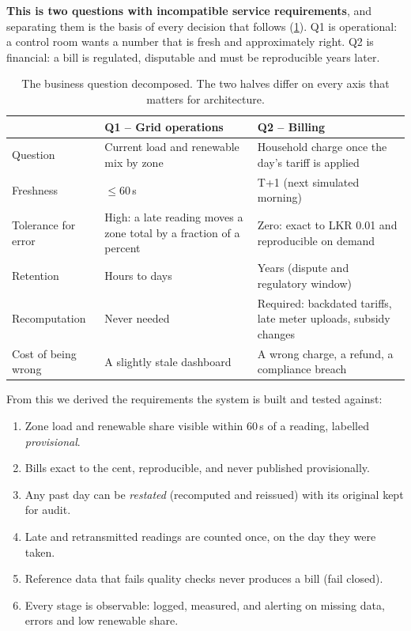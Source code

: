 \documentclass[11pt,a4paper]{article}
\newcommand{\sq}{Q}
\begin{document}
\textbf{This is two questions with incompatible service requirements}, and
separating them is the basis of every decision that follows (\cref{tab:q1q2}).
\sq1 is operational: a control room wants a number that is fresh and
approximately right. \sq2 is financial: a bill is regulated, disputable and
must be reproducible years later.

\begin{table}[!htbp]
\centering\small
\caption{The business question decomposed. The two halves differ on every axis that matters for architecture.}
\label{tab:q1q2}
\begin{tabularx}{\linewidth}{@{}l>{\raggedright\arraybackslash}X>{\raggedright\arraybackslash}X@{}}
\toprule
 & \textbf{\sq1 -- Grid operations} & \textbf{\sq2 -- Billing} \\
\midrule
Question & Current load and renewable mix by zone & Household charge once the day's tariff is applied \\
Freshness & $\le 60$\,s & T+1 (next simulated morning) \\
Tolerance for error & High: a late reading moves a zone total by a fraction of a percent & Zero: exact to LKR 0.01 and reproducible on demand \\
Retention & Hours to days & Years (dispute and regulatory window) \\
Recomputation & Never needed & Required: backdated tariffs, late meter uploads, subsidy changes \\
Cost of being wrong & A slightly stale dashboard & A wrong charge, a refund, a compliance breach \\
\bottomrule
\end{tabularx}
\end{table}

From this we derived the requirements the system is built and tested against:

\begin{enumerate}[label=\textbf{R\arabic*},leftmargin=2.2em]
  \item Zone load and renewable share visible within 60\,s of a reading, labelled \emph{provisional}.
  \item Bills exact to the cent, reproducible, and never published provisionally.
  \item Any past day can be \emph{restated} (recomputed and reissued) with its original kept for audit.
  \item Late and retransmitted readings are counted once, on the day they were taken.
  \item Reference data that fails quality checks never produces a bill (fail closed).
  \item Every stage is observable: logged, measured, and alerting on missing data, errors and low renewable share.
\end{enumerate}
\end{document}

